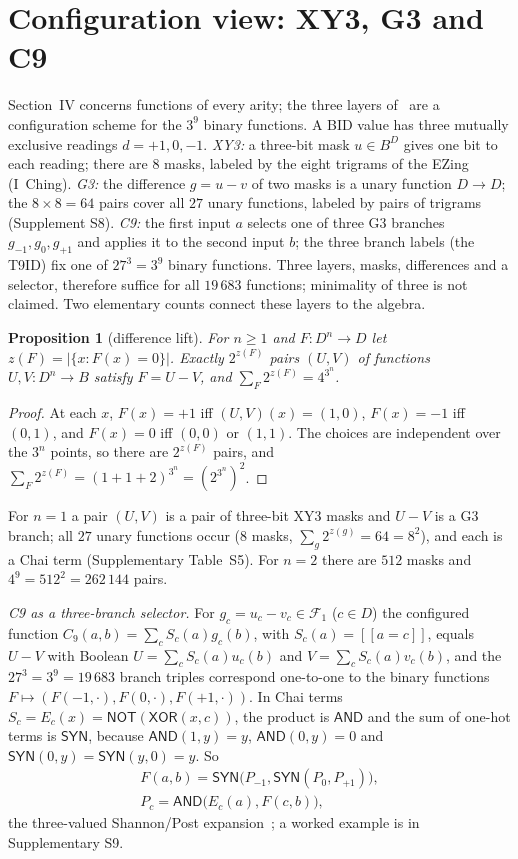 \documentclass[conference]{IEEEtran}
\newcommand{\D}{D}
\newcommand{\SYN}{\mathsf{SYN}}
\newcommand{\XOR}{\mathsf{XOR}}
\newcommand{\AND}{\mathsf{AND}}
\newcommand{\NOT}{\mathsf{NOT}}
\newcommand{\Fone}{\mathcal F_1}
\newcommand{\iv}[1]{[\![#1]\!]}
\newcommand{\chai}{Chai}
\newtheorem{proposition}{Proposition}
\theoremstyle{remark}
\begin{document}
	\section{Configuration view: XY3, G3 and C9}\label{sec:c9}
	Section~IV concerns functions of every arity; the three layers of~\cite{caiCN} are a configuration scheme for the $3^9$ binary functions. A BID value has three mutually exclusive readings $d=+1,0,-1$. \emph{XY3:} a three-bit mask $u\in B^{\D}$ gives one bit to each reading; there are $8$ masks, labeled by the eight trigrams of the EZing (I~Ching). \emph{G3:} the difference $g=u-v$ of two masks is a unary function $\D\to\D$; the $8\times8=64$ pairs cover all $27$ unary functions, labeled by pairs of trigrams~\cite{caiWO,caiCN} (Supplement S8). \emph{C9:} the first input $a$ selects one of three G3 branches $g_{-1},g_0,g_{+1}$ and applies it to the second input $b$; the three branch labels (the T9ID) fix one of $27^3=3^9$ binary functions. Three layers, masks, differences and a selector, therefore suffice for all $19\,683$ functions; minimality of three is not claimed. Two elementary counts connect these layers to the algebra.
	
	\begin{proposition}[difference lift]\label{prop:lift}
		For $n\ge1$ and $F:\D^n\to\D$ let $z(F)=|\{x:F(x)=0\}|$. Exactly $2^{z(F)}$ pairs $(U,V)$ of functions $U,V:\D^n\to B$ satisfy $F=U-V$, and $\sum_F2^{z(F)}=4^{3^n}$.
	\end{proposition}
	\begin{proof}
		At each $x$, $F(x)=+1$ iff $(U,V)(x)=(1,0)$, $F(x)=-1$ iff $(0,1)$, and $F(x)=0$ iff $(0,0)$ or $(1,1)$. The choices are independent over the $3^n$ points, so there are $2^{z(F)}$ pairs, and $\sum_F2^{z(F)}=(1+1+2)^{3^n}=(2^{3^n})^2$.
	\end{proof}
	For $n=1$ a pair $(U,V)$ is a pair of three-bit XY3 masks and $U-V$ is a G3 branch; all $27$ unary functions occur ($8$ masks, $\sum_g2^{z(g)}=64=8^2$), and each is a \chai{} term (Supplementary Table~S5). For $n=2$ there are $512$ masks and $4^9=512^2=262\,144$ pairs.
	
	\emph{C9 as a three-branch selector.} For $g_c=u_c-v_c\in\Fone$ ($c\in\D$) the configured function $C_9(a,b)=\sum_cS_c(a)g_c(b)$, with $S_c(a)=\iv{a=c}$, equals $U-V$ with Boolean $U=\sum_cS_c(a)u_c(b)$ and $V=\sum_cS_c(a)v_c(b)$, and the $27^3=3^9=19\,683$ branch triples correspond one-to-one to the binary functions $F\mapsto(F(-1,\cdot),F(0,\cdot),F(+1,\cdot))$. In \chai{} terms $S_c=E_c(x)=\NOT(\XOR(x,c))$, the product is $\AND$ and the sum of one-hot terms is $\SYN$, because $\AND(1,y)=y$, $\AND(0,y)=0$ and $\SYN(0,y)=\SYN(y,0)=y$. So
	\begin{multline*}
		F(a,b)=\SYN\big(P_{-1},\SYN(P_0,P_{+1})\big),\\
		P_c=\AND\big(E_c(a),F(c,b)\big),
	\end{multline*}
	the three-valued Shannon/Post expansion~\cite{post1921,rosenbloom1942}; a worked example is in Supplementary S9.
	
\end{document}
